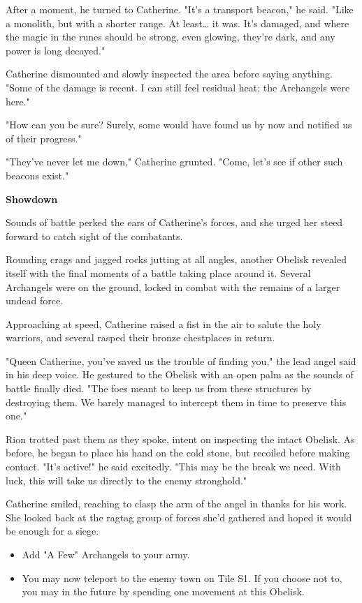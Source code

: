 \begin{multicols*}{2}
After a moment, he turned to Catherine. "It's a transport beacon," he said. "Like a monolith, but with a shorter range. At least… it was. It's damaged, and where the magic in the runes should be strong, even glowing, they're dark, and any power is long decayed."

Catherine dismounted and slowly inspected the area before saying anything. "Some of the damage is recent. I can still feel residual heat; the Archangels were here."

"How can you be sure? Surely, some would have found us by now and notified us of their progress."

"They've never let me down," Catherine grunted. "Come, let's see if other such beacons exist."

\textbf{Showdown}

Sounds of battle perked the ears of Catherine's forces, and she urged her steed forward to catch sight of the combatants.

Rounding crags and jagged rocks jutting at all angles, another Obelisk revealed itself with the final moments of a battle taking place around it. Several Archangels were on the ground, locked in combat with the remains of a larger undead force.

Approaching at speed, Catherine raised a fist in the air to salute the holy warriors, and several rasped their bronze chestplaces in return.

"Queen Catherine, you've saved us the trouble of finding you," the lead angel said in his deep voice. He gestured to the Obelisk with an open palm as the sounds of battle finally died. "The foes meant to keep us from these structures by destroying them. We barely managed to intercept them in time to preserve this one."

Rion trotted past them as they spoke, intent on inspecting the intact Obelisk. As before, he began to place his hand on the cold stone, but recoiled before making contact. "It's active!" he said excitedly. "This may be the break we need. With luck, this will take us directly to the enemy stronghold."

Catherine smiled, reaching to clasp the arm of the angel in thanks for his work. She looked back at the ragtag group of forces she'd gathered and hoped it would be enough for a siege.

\begin{itemize}
  \item \textcolor{darkcandyapplered}{Add "A Few" Archangels to your army.}
  \item \textcolor{darkcandyapplered}{You may now teleport to the enemy town on Tile S1. If you choose not to, you may in the future by spending one movement at this Obelisk.}
\end{itemize}



\end{multicols*}
